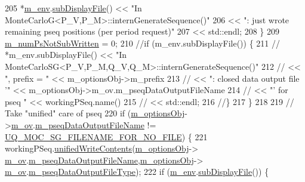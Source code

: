 \begin{DoxyCode}
205       *\hyperlink{class_q_u_e_s_o_1_1_monte_carlo_s_g_a30055a359b22cde54681679aed8ae6e7}{m\_env}.\hyperlink{class_q_u_e_s_o_1_1_base_environment_a8a0064746ae8dddfece4229b9ad374d6}{subDisplayFile}() << \textcolor{stringliteral}{"In MonteCarloG<P\_V,P\_M>::internGenerateSequence()"}
206                               << \textcolor{stringliteral}{": just wrote remaining pseq positions (per period request)"}
207                               << std::endl;
208     \}
209     \hyperlink{class_q_u_e_s_o_1_1_monte_carlo_s_g_a1bd46f12e850ab8d239205aafdae72af}{m\_numPsNotSubWritten} = 0;
210     \textcolor{comment}{//if (m\_env.subDisplayFile()) \{}
211     \textcolor{comment}{//  *m\_env.subDisplayFile() << "In MonteCarloSG<P\_V,P\_M,Q\_V,Q\_M>::internGenerateSequence()"}
212     \textcolor{comment}{//                          << ", prefix = "                 << m\_optionsObj->m\_prefix}
213     \textcolor{comment}{//                          << ": closed data output file '" <<
       m\_optionsObj->m\_ov.m\_pseqDataOutputFileName}
214     \textcolor{comment}{//                          << "' for pseq "                 << workingPSeq.name()}
215     \textcolor{comment}{//                          << std::endl;}
216     \textcolor{comment}{//\}}
217   \}
218 
219   \textcolor{comment}{// Take "unified" care of pseq}
220   \textcolor{keywordflow}{if} (\hyperlink{class_q_u_e_s_o_1_1_monte_carlo_s_g_acf7ce935648fd3a5d0ee23685708b4ca}{m\_optionsObj}->\hyperlink{class_q_u_e_s_o_1_1_monte_carlo_s_g_options_a4bc6849a41ede87425cad9ab6e97df11}{m\_ov}.\hyperlink{class_q_u_e_s_o_1_1_mc_options_values_a8db3604c003959cb7ae7144a6bb37834}{m\_pseqDataOutputFileName} != 
      \hyperlink{_monte_carlo_s_g_options_8h_a0c480f57c47ffbb3b11b838ba7734d15}{UQ\_MOC\_SG\_FILENAME\_FOR\_NO\_FILE}) \{
221     workingPSeq.\hyperlink{class_q_u_e_s_o_1_1_base_vector_sequence_a3987ee6d026842e4ddaeaf0bc850ef83}{unifiedWriteContents}(\hyperlink{class_q_u_e_s_o_1_1_monte_carlo_s_g_acf7ce935648fd3a5d0ee23685708b4ca}{m\_optionsObj}->
      \hyperlink{class_q_u_e_s_o_1_1_monte_carlo_s_g_options_a4bc6849a41ede87425cad9ab6e97df11}{m\_ov}.\hyperlink{class_q_u_e_s_o_1_1_mc_options_values_a8db3604c003959cb7ae7144a6bb37834}{m\_pseqDataOutputFileName},\hyperlink{class_q_u_e_s_o_1_1_monte_carlo_s_g_acf7ce935648fd3a5d0ee23685708b4ca}{m\_optionsObj}->
      \hyperlink{class_q_u_e_s_o_1_1_monte_carlo_s_g_options_a4bc6849a41ede87425cad9ab6e97df11}{m\_ov}.\hyperlink{class_q_u_e_s_o_1_1_mc_options_values_a7409d101fbe0676f87754234567dbc33}{m\_pseqDataOutputFileType});
222     \textcolor{keywordflow}{if} (\hyperlink{class_q_u_e_s_o_1_1_monte_carlo_s_g_a30055a359b22cde54681679aed8ae6e7}{m\_env}.\hyperlink{class_q_u_e_s_o_1_1_base_environment_a8a0064746ae8dddfece4229b9ad374d6}{subDisplayFile}()) \{

\end{DoxyCode}
